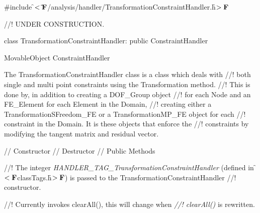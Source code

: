 
\indent \#include \f$<\tilde{
}{\bf F}$/analysis/handler/TransformationConstraintHandler.h\f$>{\bf F}$ 

//! UNDER CONSTRUCTION.

\indent class TransformationConstraintHandler: public ConstraintHandler

\indent MovableObject
\indent\indent ConstraintHandler
\indent\indent{}

\indent The TransformationConstraintHandler class is a class which deals with
//! both single and multi point constraints using the Transformation method. 
//! This is done by, in addition to creating a DOF\_Group object
//! for each Node and an FE\_Element for each Element in the Domain,
//! creating either a TransformationSFreedom\_FE or a TransformationMP\_FE object for each
//! constraint in the Domain. It is these objects that enforce the
//! constraints by modifying the tangent matrix and residual vector. 


\indent // Constructor
\indent // Destructor
\indent // Public Methods


//! The integer {\em HANDLER\_TAG\_TransformationConstraintHandler} (defined in
\f$<{\bf F}$classTags.h\f$>{\bf F}$) is passed to the TransformationConstraintHandler
//! constructor. 

//! Currently invokes clearAll(), this will change when {\em
//! clearAll()} is rewritten.

